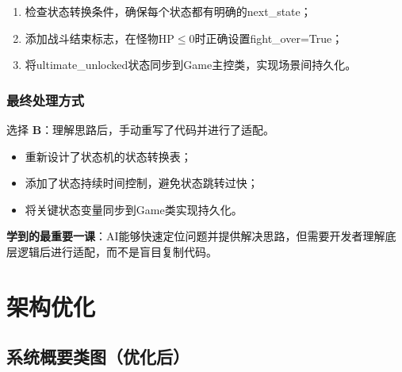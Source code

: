 \documentclass[a4paper,12pt]{article}
\begin{document}
\begin{enumerate}[label=(\arabic*)]
    \item 检查状态转换条件，确保每个状态都有明确的next\_state；
    \item 添加战斗结束标志，在怪物HP$\leq$0时正确设置fight\_over=True；
    \item 将ultimate\_unlocked状态同步到Game主控类，实现场景间持久化。
\end{enumerate}

\subsubsection{最终处理方式}

选择 \textbf{B}：理解思路后，手动重写了代码并进行了适配。

\begin{itemize}
    \item 重新设计了状态机的状态转换表；
    \item 添加了状态持续时间控制，避免状态跳转过快；
    \item 将关键状态变量同步到Game类实现持久化。
\end{itemize}

\textbf{学到的最重要一课}：AI能够快速定位问题并提供解决思路，但需要开发者理解底层逻辑后进行适配，而不是盲目复制代码。

\section{架构优化}

\subsection{系统概要类图（优化后）}
\end{document}
